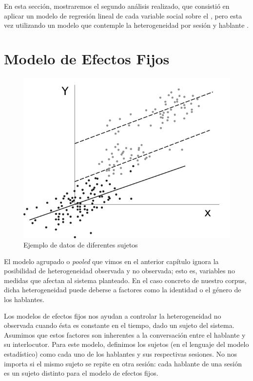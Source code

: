 En esta sección, mostraremos el segundo análisis realizado, que consistió en aplicar un modelo de regresión lineal de cada variable social sobre el \absentrainment, pero esta vez utilizando un modelo que contemple la heterogeneidad por sesión y hablante .

\section{Modelo de Efectos Fijos}

\begin{figure}[t]
\centering
\includegraphics[scale=1]{images/fixed_effects_example.pdf}
\caption{Ejemplo de datos de diferentes sujetos}
\label{fig:efectos_fijo}
\end{figure}



\newcommand{\slopeestim}[1] { $\estslope \sim #1$ }

El modelo agrupado o \emph{pooled} que vimos en el anterior capítulo ignora la posibilidad de heterogeneidad observada y no observada; esto es, variables no medidas que afectan al sistema planteado. En el caso concreto de nuestro corpus, dicha heterogeneidad puede deberse a factores como la identidad o el género de los hablantes.

Los modelos de efectos fijos nos ayudan a controlar la heterogeneidad no observada cuando ésta es constante en el tiempo, dado un sujeto del sistema. Asumimos que estos factores son inherentes a la conversación entre el hablante y su interlocutor. Para este modelo, definimos los sujetos (en el lenguaje del modelo estadístico) como cada uno de los hablantes y sus respectivas sesiones. No nos importa si el mismo sujeto se repite en otra sesión: cada hablante de una sesión es un sujeto distinto para el modelo de efectos fijos.


